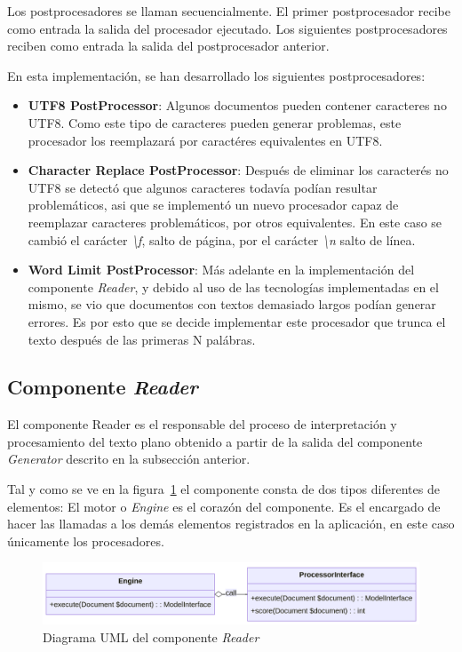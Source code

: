 Los postprocesadores se llaman secuencialmente.
El primer postprocesador recibe como entrada la salida del procesador ejecutado.
Los siguientes postprocesadores reciben como entrada la salida del postprocesador anterior.

En esta implementación, se han desarrollado los siguientes postprocesadores:

\begin{itemize}
    \item \textbf{UTF8 PostProcessor}: Algunos documentos pueden contener caracteres no UTF8. Como este tipo de
    caracteres pueden generar problemas, este procesador los reemplazará por caractéres equivalentes en UTF8.
    \item \textbf{Character Replace PostProcessor}: Después de eliminar los caracterés no UTF8 se detectó que algunos
    caracteres todavía podían resultar problemáticos, asi que se implementó un nuevo procesador capaz de reemplazar
    caracteres problemáticos, por otros equivalentes.
    En este caso se cambió el carácter \textit{\textbackslash f}, salto de página, por el carácter
    \textit{\textbackslash n} salto de línea.
    \item \textbf{Word Limit PostProcessor}: Más adelante en la implementación del componente \textit{Reader}, y debido
    al uso de las tecnologías implementadas en el mismo, se vio que documentos con textos demasiado largos podían
    generar errores.
    Es por esto que se decide implementar este procesador que trunca el texto después de las primeras N palábras.
\end{itemize}

\subsection{Componente \textit{Reader}}\label{subsec:chapter_4.reader_component}
El componente Reader es el responsable del proceso de interpretación y procesamiento del texto plano obtenido a
partir de la salida del componente \textit{Generator} descrito en la subsección anterior.

Tal y como se ve en la figura~\ref{fig:chapter_4.1.reader_component_uml} el componente consta de dos tipos diferentes de
elementos: El motor o \textit{Engine} es el corazón del componente.
Es el encargado de hacer las llamadas a los demás elementos registrados en la aplicación, en este caso únicamente los
procesadores.

\begin{figure}[ht]
    \begin{center}
        \includegraphics[width=\textwidth]{./chapter/4/images/chapter_4.1.reader_component_uml}
        \caption{Diagrama UML del componente \textit{Reader}}
        \label{fig:chapter_4.1.reader_component_uml}
    \end{center}
\end{figure}

